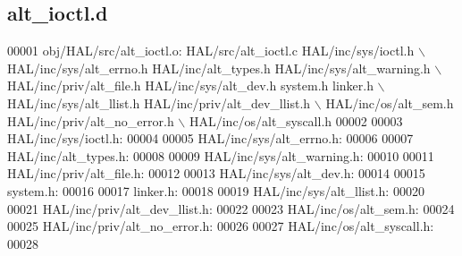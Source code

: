 \subsection{alt\+\_\+ioctl.\+d}
\label{alt__ioctl_8d_source}

\begin{DoxyCode}
00001 obj/HAL/src/alt\_ioctl.o: HAL/src/alt\_ioctl.c HAL/inc/sys/ioctl.h \(\backslash\)
 HAL/inc/sys/alt_errno.h HAL/inc/alt\_types.h HAL/inc/sys/alt\_warning.h \(\backslash\)
 HAL/inc/priv/alt\_file.h HAL/inc/sys/alt_dev.h system.h linker.h \(\backslash\)
 HAL/inc/sys/alt_llist.h HAL/inc/priv/alt_dev_llist.h \(\backslash\)
 HAL/inc/os/alt\_sem.h HAL/inc/priv/alt_no_error.h \(\backslash\)
 HAL/inc/os/alt\_syscall.h
00002 
00003 HAL/inc/sys/ioctl.h:
00004 
00005 HAL/inc/sys/alt_errno.h:
00006 
00007 HAL/inc/alt\_types.h:
00008 
00009 HAL/inc/sys/alt\_warning.h:
00010 
00011 HAL/inc/priv/alt\_file.h:
00012 
00013 HAL/inc/sys/alt_dev.h:
00014 
00015 system.h:
00016 
00017 linker.h:
00018 
00019 HAL/inc/sys/alt_llist.h:
00020 
00021 HAL/inc/priv/alt_dev_llist.h:
00022 
00023 HAL/inc/os/alt\_sem.h:
00024 
00025 HAL/inc/priv/alt_no_error.h:
00026 
00027 HAL/inc/os/alt\_syscall.h:
00028 \end{DoxyCode}
